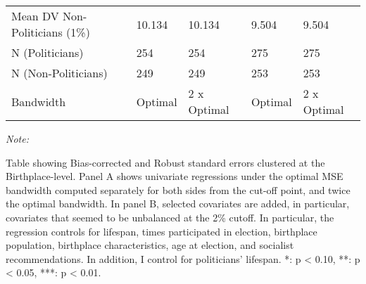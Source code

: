 \begin{table}[!h]
\begin{threeparttable}
\begin{tabular}[t]{lllll}
\hspace{1em}Mean DV Non-Politicians (1\%) & 10.134 & 10.134 & 9.504 & 9.504\\
\hspace{1em}N (Politicians) & 254 & 254 & 275 & 275\\
\hspace{1em}N (Non-Politicians) & 249 & 249 & 253 & 253\\
\hspace{1em}Bandwidth & Optimal & 2 x Optimal & Optimal & 2 x Optimal\\
\bottomrule
\end{tabular}
\begin{tablenotes}[para]
\item \textit{Note: } 
\item Table showing Bias-corrected and Robust standard errors clustered at the Birthplace-level. Panel A shows univariate regressions under the optimal MSE bandwidth computed separately for both sides from the cut-off point, and twice the optimal bandwidth. In panel B, selected covariates are added, in particular, covariates that seemed to be unbalanced at the 2\% cutoff. In particular, the regression controls for lifespan, times participated in election, birthplace population, birthplace characteristics, age at election, and socialist recommendations. In addition, I control for politicians' lifespan. *: p < 0.10, **: p < 0.05, ***: p < 0.01.
\end{tablenotes}
\end{threeparttable}
\end{table}
